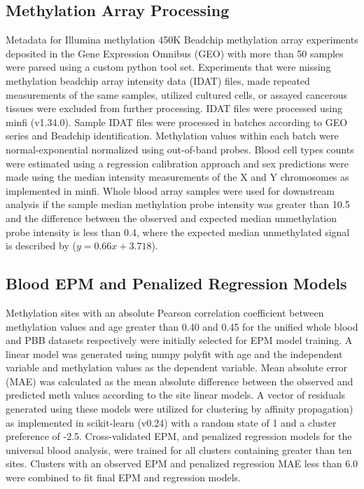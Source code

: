 \documentclass{article}
\begin{document}
{\begin{linenumbers}
\subsection{ Methylation Array Processing}

Metadata for Illumina methylation 450K Beadchip methylation array experiments deposited in the Gene Expression 
Omnibus (GEO) \cite{Barrett2012-gu} with more than 50 samples were parsed using a custom python tool set. Experiments 
that were missing methylation beadchip array intensity data (IDAT) files, made repeated measurements of the same 
samples, utilized cultured cells, or assayed cancerous tissues were excluded from further processing. IDAT files 
were processed using minfi\cite{Aryee2014-ky} (v1.34.0). Sample IDAT files were processed in batches according to 
GEO series and Beadchip  identification. Methylation values within each batch were normal-exponential normalized 
using out-of-band probes\cite{Triche2013-pp}. Blood cell types counts were estimated using a regression calibration 
approach\cite{Houseman2012-rr} and sex predictions were made using the median intensity measurements of the X and Y 
chromosomes as implemented in minfi\cite{Aryee2014-ky}. Whole blood array samples were used for downstream analysis 
if the sample median methylation probe intensity was greater than 10.5 and the difference between the observed and 
expected median unmethylation probe intensity is less than 0.4, where the expected median unmethylated signal is 
described by ($y=0.66x + 3.718$). 

\subsection{Blood EPM and Penalized Regression Models}

Methylation sites with an absolute Pearson correlation coefficient between methylation values and age greater than 
0.40 and 0.45 for the unified whole blood and PBB datasets respectively were initially selected for EPM model 
training. A linear model was generated using numpy polyfit \cite{Harris2020-yb} with age and the independent 
variable and methylation values as the dependent variable. Mean absolute error (MAE) was calculated as the mean 
absolute difference between the observed and predicted meth values according to the site linear models. A vector 
of residuals generated using these models were utilized for clustering by affinity propagation\cite{Frey2007-mu}) 
as implemented in scikit-learn (v0.24)\cite{Pedregosa2011-fi} with a random state of 1 and a cluster preference of 
-2.5. Cross-validated EPM, and penalized regression models for the universal blood analysis,  were trained for all 
clusters containing greater than ten sites. Clusters with an observed EPM and penalized regression MAE less than 6.0 
were combined to fit final EPM and regression models. 


\end{linenumbers}}
\end{document}
